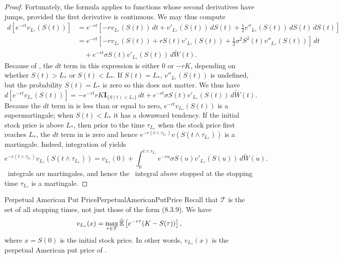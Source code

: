 \begin{proof}
	Fortunately, the \Ito{} formula applies to functions whose second derivatives have jumps, provided the first derivative is continuous. We may thus compute
	\begin{align*}
		d\left[e^{-rt}v_{L_*}(S(t))\right]
		 & = e^{-rt}\left[-rv_{L_*}(S(t)) \, dt + v'_{L_*}(S(t)) \, dS(t) + \frac{1}{2}v''_{L_*}(S(t)) \, dS(t) \, dS(t)\right] \\
		 & = e^{-rt}\left[-rv_{L_*}(S(t)) + rS(t)v'_{L_*}(S(t)) + \frac{1}{2}\sigma^2 S^2(t)v''_{L_*}(S(t))\right] \, dt        \\
		 & \quad + e^{-rt}\sigma S(t)v'_{L_*}(S(t)) \, d\widetilde{W}(t).
	\end{align*}
	Because of , the $dt$ term in this expression is either $0$ or $-rK$, depending on whether $S(t) > L_*$ or $S(t) < L_*$. If $S(t) = L_*$, $v''_{L_*}(S(t))$ is undefined, but the probability $S(t) = L_*$ is zero so this does not matter. We thus have
	\begin{equation} \label{eq:SupermartingaleDifferential}
		d\left[e^{-rt}v_{L_*}(S(t))\right] = -e^{-rt}rK\mathbf{I}_{\{S(t)<L_*\}} \, dt + e^{-rt}\sigma S(t)v'_{L_*}(S(t)) \, d\widetilde{W}(t).
	\end{equation}
	Because the $dt$ term in  is less than or equal to zero, $e^{-rt}v_{L_*}(S(t))$ is a supermartingale; when $S(t) < L_*$ it has a downward tendency. If the initial stock price is above $L_*$, then prior to the time $\tau_{L_*}$ when the stock price first reaches $L_*$, the $dt$ term in  is zero and hence $e^{-r(t \land \tau_{L_*})}v(S(t \land \tau_{L_*}))$ is a martingale. Indeed, integration of  yields
	\[
		e^{-r(t\land\tau_{L_*})}v_{L_*}(S(t \land \tau_{L_*})) = v_{L_*}(0) + \int_0^{t\land\tau_{L_*}} e^{-ru}\sigma S(u)v'_{L_*}(S(u)) \, d\widetilde{W}(u).
	\]
	\Ito\ integrals are martingales, and hence the \Ito\ integral above stopped at the stopping time $\tau_{L_*}$ is a martingale.
\end{proof}

\begin{cor}{Perpetual American Put Price}{PerpetualAmericanPutPrice}
	Recall that $\mathcal{T}$ is the set of all stopping times, not just those of the form (8.3.9). We have
	\[
		v_{L_*}(x) = \max_{\tau \in \mathcal{T}} \widetilde{\mathbb{E}} \left[e^{-r\tau} (K - S(\tau))\right],
	\]
	where $x = S(0)$ is the initial stock price. In other words, $v_{L_*}(x)$ is the perpetual American put price of .
\end{cor}

